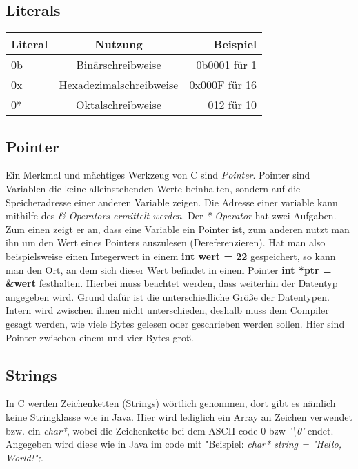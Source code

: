 \documentclass{article}
\begin{document}
\subsection{Literals}
\begin{center}
\begin{tabular}{| l | c | r |}
	\hline
	\textbf{Literal} & \textbf{Nutzung} &  \textbf{Beispiel} \\ \hline
    0b & Binärschreibweise & 0b0001 für 1\\
    0x & Hexadezimalschreibweise & 0x000F für 16\\
	0* & Oktalschreibweise & 012 für 10\\
	\hline
\end{tabular}
\end{center}

\subsection{Pointer}
Ein Merkmal und mächtiges Werkzeug von C sind \textit{Pointer}. Pointer sind Variablen die keine alleinstehenden Werte beinhalten, sondern auf die Speicheradresse einer anderen Variable zeigen.
Die Adresse einer variable kann mithilfe des \textit{\&-Operators ermittelt werden}. Der \textit{*-Operator} hat zwei Aufgaben. Zum einen zeigt er an, dass eine Variable ein Pointer ist, zum anderen nutzt man ihn um den Wert eines Pointers auszulesen (Dereferenzieren).
Hat man also beispielsweise einen Integerwert in einem \textbf{int wert = 22} gespeichert, so kann man den Ort, an dem sich dieser Wert befindet in einem Pointer \textbf{int *ptr = \&wert} festhalten. Hierbei muss beachtet werden, dass weiterhin der Datentyp angegeben wird.
Grund dafür ist die unterschiedliche Größe der Datentypen. Intern wird zwischen ihnen nicht unterschieden, deshalb muss dem Compiler gesagt werden, wie viele Bytes gelesen oder geschrieben werden sollen. Hier sind Pointer zwischen einem und vier Bytes groß.

\subsection{Strings}
In C werden Zeichenketten (Strings) wörtlich genommen, dort gibt es nämlich keine Stringklasse wie in Java. Hier wird lediglich ein Array an Zeichen verwendet bzw. ein \textit{char*}, wobei die Zeichenkette bei dem ASCII code 0 bzw \textit{'\textbackslash 0'} endet.
Angegeben wird diese wie in Java im code mit "\newline Beispiel: \textit{char* string = "Hello, World!";}.
\end{document}
